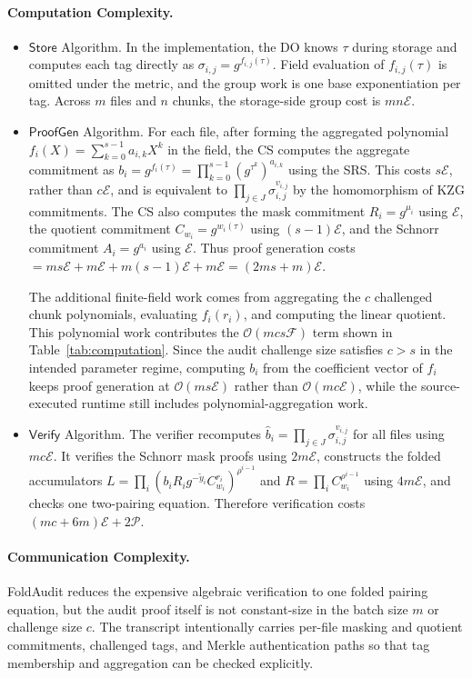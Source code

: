 \documentclass[lettersize,journal]{IEEEtran}
\newcommand{\CompExp}{\mathcal{E}}
\newcommand{\CompPair}{\mathcal{P}}
\newcommand{\CompField}{\mathcal{F}}
\newcommand{\Store}{\mathsf{Store}}
\newcommand{\ProofGen}{\mathsf{ProofGen}}
\newcommand{\Verify}{\mathsf{Verify}}
\begin{document}
\paragraph{Computation Complexity.} 
\begin{itemize}
    \item $\Store$ Algorithm. In the implementation, the DO knows \(\tau\) during storage and computes each tag directly as \(\sigma_{i,j}=g^{f_{i,j}(\tau)}\). Field evaluation of \(f_{i,j}(\tau)\) is omitted under the metric, and the group work is one base exponentiation per tag. Across $m$ files and $n$ chunks, the storage-side group cost is
    $mn\CompExp.$
    \item $\ProofGen$ Algorithm. For each file, after forming the aggregated polynomial $f_i(X)=\sum_{k=0}^{s-1}a_{i,k}X^k$ in the field, the CS computes the aggregate commitment as $b_i=g^{f_i(\tau)}=\prod_{k=0}^{s-1}(g^{\tau^k})^{a_{i,k}}$ using the SRS. This costs $s\CompExp$, rather than $c\CompExp$, and is equivalent to $\prod_{j\in J}\sigma_{i,j}^{v_{i,j}}$ by the homomorphism of KZG commitments. The CS also computes the mask commitment $R_i=g^{\mu_i}$ using $\CompExp$, the quotient commitment $C_{w_i}=g^{w_i(\tau)}$ using $(s-1)\CompExp$, and the Schnorr commitment $A_i=g^{a_i}$ using $\CompExp$. Thus proof generation costs $= ms\CompExp+m\CompExp+m(s-1)\CompExp+m\CompExp = (2ms+m)\CompExp.$
    
    The additional finite-field work comes from aggregating the $c$ challenged chunk polynomials, evaluating $f_i(r_i)$, and computing the linear quotient. This polynomial work contributes the \(\mathcal{O}(mcs\CompField)\) term shown in Table~\ref{tab:computation}. Since the audit challenge size satisfies $c>s$ in the intended parameter regime, computing $b_i$ from the coefficient vector of $f_i$ keeps proof generation at $\mathcal{O}(ms\CompExp)$ rather than $\mathcal{O}(mc\CompExp)$, while the source-executed runtime still includes polynomial-aggregation work.
    \item $\Verify$ Algorithm. The verifier recomputes $\hat b_i=\prod_{j\in J}\sigma_{i,j}^{v_{i,j}}$ for all files using $mc\CompExp$. It verifies the Schnorr mask proofs using $2m\CompExp$, constructs the folded accumulators $L=\prod_i(b_iR_ig^{-\tilde{y}_i}C_{w_i}^{r_i})^{\rho^{i-1}}$ and $R=\prod_iC_{w_i}^{\rho^{i-1}}$ using $4m\CompExp$, and checks one two-pairing equation. Therefore verification costs $(mc+6m)\CompExp+2\CompPair.$
\end{itemize}

\paragraph{Communication Complexity.}
FoldAudit reduces the expensive algebraic verification to one folded pairing equation, but the audit proof itself is not constant-size in the batch size $m$ or challenge size $c$. The transcript intentionally carries per-file masking and quotient commitments, challenged tags, and Merkle authentication paths so that tag membership and aggregation can be checked explicitly.
\end{document}
